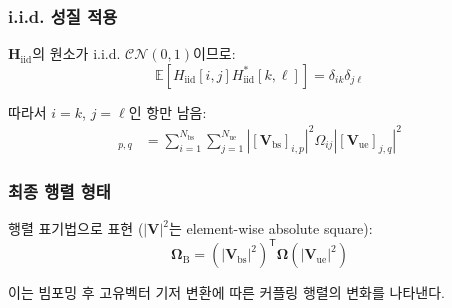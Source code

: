 \documentclass[10pt]{article}
\begin{document}
\subsubsection{i.i.d. 성질 적용}
$\mathbf{H}_{\text{iid}}$의 원소가 i.i.d. $\mathcal{CN}(0,1)$이므로:
\begin{equation}
\mathbb{E}[H_{\text{iid}}[i,j] H_{\text{iid}}^*[k,\ell]] = \delta_{ik}\delta_{j\ell}
\end{equation}

따라서 $i=k$, $j=\ell$인 항만 남음:
\begin{align}
[\boldsymbol{\Omega}_{\text{B}}]_{p,q} &= \sum_{i=1}^{N_{\text{bs}}} \sum_{j=1}^{N_{\text{ue}}} |[\mathbf{V}_{\text{bs}}]_{i,p}|^2 \Omega_{ij} |[\mathbf{V}_{\text{ue}}]_{j,q}|^2
\end{align}

\subsubsection{최종 행렬 형태}
행렬 표기법으로 표현 ($|\mathbf{V}|^2$는 element-wise absolute square):
\begin{equation}
\boldsymbol{\Omega}_{\text{B}} = (|\mathbf{V}_{\text{bs}}|^2)^{\mathsf{T}} \boldsymbol{\Omega} (|\mathbf{V}_{\text{ue}}|^2)
\end{equation}

이는 빔포밍 후 고유벡터 기저 변환에 따른 커플링 행렬의 변화를 나타낸다.
\end{document}
